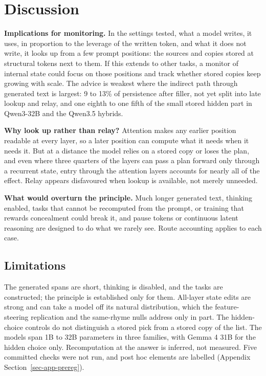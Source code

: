 \documentclass[
]{article}
\begin{document}
\section{Discussion}\label{sec-discussion}

\textbf{Implications for monitoring.} In the settings tested, what a
model writes, it uses, in proportion to the leverage of the written
token, and what it does not write, it looks up from a few prompt
positions: the sources and copies stored at structural tokens next to
them. If this extends to other tasks, a monitor of internal state could
focus on those positions and track whether stored copies keep growing
with scale. The advice is weakest where the indirect path through
generated text is largest: 9 to 13\% of persistence after filler, not
yet split into late lookup and relay, and one eighth to one fifth of the
small stored hidden part in Qwen3-32B and the Qwen3.5 hybrids.

\textbf{Why look up rather than relay?} Attention makes any earlier
position readable at every layer, so a later position can compute what
it needs when it needs it. But at a distance the model relies on a
stored copy or loses the plan, and even where three quarters of the
layers can pass a plan forward only through a recurrent state, entry
through the attention layers accounts for nearly all of the effect.
Relay appears disfavoured when lookup is available, not merely unneeded.

\textbf{What would overturn the principle.} Much longer generated text,
thinking enabled, tasks that cannot be recomputed from the prompt, or
training that rewards concealment \citep{baker2025monitoring} could
break it, and pause tokens \citep{goyal2024pause} or continuous latent
reasoning \citep{hao2024coconut} are designed to do what we rarely see.
Route accounting applies to each case.

\subsection{Limitations}\label{sec-limitations}

The generated spans are short, thinking is disabled, and the tasks are
constructed; the principle is established only for them. All-layer state
edits are strong and can take a model off its natural distribution,
which the feature-steering replication and the same-rhyme nulls address
only in part. The hidden-choice controls do not distinguish a stored
pick from a stored copy of the list. The models span 1B to 32B
parameters in three families, with Gemma 4 31B for the hidden choice
only. Recomputation at the answer is inferred, not measured. Five
committed checks were not run, and post hoc elements are labelled
(Appendix Section~\ref{sec-app-prereg}).
\end{document}
